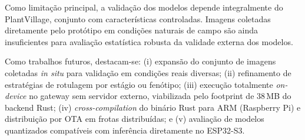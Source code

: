 \documentclass[12pt]{article}
\begin{document}
Como limitação principal, a validação dos modelos depende integralmente do
PlantVillage, conjunto com características controladas. Imagens coletadas
diretamente pelo protótipo em condições naturais de campo são ainda
insuficientes para avaliação estatística robusta da validade externa dos
modelos.

Como trabalhos futuros, destacam-se: (i) expansão do conjunto de imagens
coletadas \emph{in situ} para validação em condições reais diversas; (ii)
refinamento de estratégias de rotulagem por estágio ou fenótipo; (iii)
execução totalmente \emph{on-device} no gateway sem servidor externo,
viabilizada pelo footprint de 38\,MB do backend Rust; (iv) \textit{cross-compilation}
do binário Rust para ARM (Raspberry Pi) e distribuição por OTA em frotas
distribuídas; e (v) avaliação de modelos quantizados compatíveis com
inferência diretamente no ESP32-S3.



\end{document}
